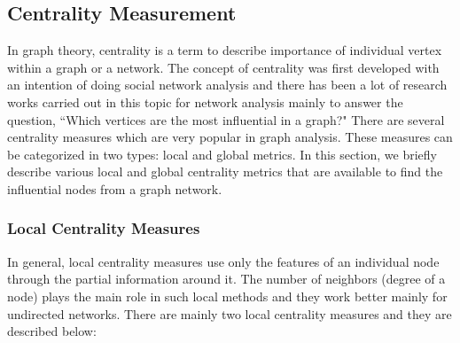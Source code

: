 \documentclass[sigconf]{acmart}
\begin{document}
\subsection{Centrality Measurement}
In graph theory, centrality is a term to describe importance of individual vertex within a graph or a network. The concept of centrality was first developed with an intention of doing social network analysis and there has been a lot of research works carried out in this topic for network analysis mainly to answer the question, ``Which vertices are the most influential in a graph?" There are several centrality measures which are very popular in graph analysis. These measures can be categorized in two types: local and global metrics. In this section, we briefly describe various local and global centrality metrics that are available to find the influential nodes from a graph network.

\subsubsection{Local Centrality Measures}
In general, local centrality measures use only the features of an individual node through the partial information around it. The number of neighbors (degree of a node) plays the main role in such local methods and they work better mainly for undirected networks. There are mainly two local centrality measures and they are described below:
\end{document}
